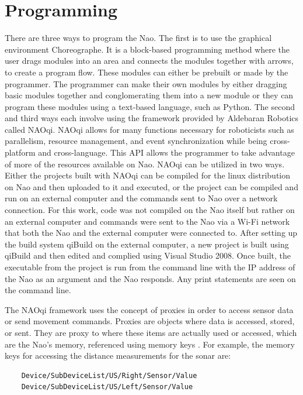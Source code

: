 \section{Programming}
There are three ways to program the Nao. The first is to use the graphical environment Choreographe. It is a block-based programming method where the user drags modules into an area and connects the modules together with arrows, to create a program flow. These modules can either be prebuilt or made by the programmer. The programmer can make their own modules by either dragging basic modules together and conglomerating them into a new module or they can program these modules using a text-based language, such as Python.
The second and third ways each involve using the framework provided by Aldebaran Robotics called NAOqi. NAOqi allows for many functions necessary for roboticists such as parallelism, resource management, and event synchronization while being cross-platform and cross-language\cite{NAOqi_overview1}. This API allows the programmer to take advantage of more of the resources available on Nao. NAOqi can be utilized in two ways. Either the projects built with NAOqi can be compiled for the linux distribution on Nao and then uploaded to it and executed, or the project can be compiled and run on an external computer and the commands sent to Nao over a network connection.
For this work, code was not compiled on the Nao itself but rather on an external computer and commands were sent to the Nao via a Wi-Fi network that both the Nao and the external computer were connected to. 
After setting up the build system qiBuild \cite{qiBuild_tutorial1} on the external computer, a new project is built using qiBuild and then edited and complied using Visual Studio 2008. Once built, the executable from the project is run from the command line with the IP address of the Nao as an argument and the Nao responds. Any print statements are seen on the command line.

The NAOqi framework uses the concept of proxies in order to access sensor data or send movement commands. Proxies are objects where data is accessed, stored, or sent. They are proxy to where these items are actually used or accessed, which are the Nao's memory, referenced using memory keys \cite{memory1}. For example, the memory keys for accessing the distance measurements for the sonar are:

\begin{lstlisting}
	Device/SubDeviceList/US/Right/Sensor/Value
	Device/SubDeviceList/US/Left/Sensor/Value
\end{lstlisting}

